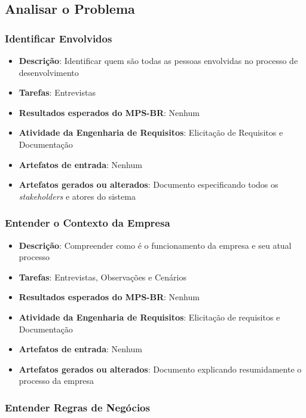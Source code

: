 \subsection{Analisar o Problema}

\subsubsection{Identificar Envolvidos}

\begin{itemize}
\item \textbf{Descrição}: Identificar quem são todas as pessoas envolvidas no processo de desenvolvimento
\item \textbf{Tarefas}: Entrevistas
\item \textbf{Resultados esperados do MPS-BR}: Nenhum
\item \textbf{Atividade da Engenharia de Requisitos}: Elicitação de Requisitos e Documentação
\item \textbf{Artefatos de entrada}: Nenhum
\item \textbf{Artefatos gerados ou alterados}: Documento especificando todos os \textit{stakeholders} e atores do sistema
\end{itemize}

\subsubsection{Entender o Contexto da Empresa}

\begin{itemize}
\item \textbf{Descrição}: Compreender como é o funcionamento da empresa e seu atual processo
\item \textbf{Tarefas}: Entrevistas, Observações e Cenários
\item \textbf{Resultados esperados do MPS-BR}: Nenhum
\item \textbf{Atividade da Engenharia de Requisitos}: Elicitação de requisitos e Documentação
\item \textbf{Artefatos de entrada}: Nenhum
\item \textbf{Artefatos gerados ou alterados}: Documento explicando resumidamente o processo da empresa
\end{itemize}

\subsubsection{Entender Regras de Negócios}

